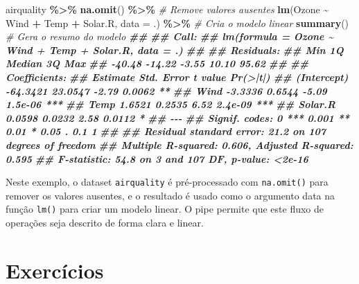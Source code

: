 \documentclass[
]{book}
\newenvironment{Shaded}{\begin{snugshade}}{\end{snugshade}}
\newcommand{\AttributeTok}[1]{\textcolor[rgb]{0.13,0.29,0.53}{#1}}
\newcommand{\CommentTok}[1]{\textcolor[rgb]{0.56,0.35,0.01}{\textit{#1}}}
\newcommand{\DocumentationTok}[1]{\textcolor[rgb]{0.56,0.35,0.01}{\textbf{\textit{#1}}}}
\newcommand{\FunctionTok}[1]{\textcolor[rgb]{0.13,0.29,0.53}{\textbf{#1}}}
\newcommand{\NormalTok}[1]{#1}
\newcommand{\SpecialCharTok}[1]{\textcolor[rgb]{0.81,0.36,0.00}{\textbf{#1}}}
\begin{document}
\begin{Shaded}
\begin{Highlighting}[]
\NormalTok{airquality }\SpecialCharTok{\%\textgreater{}\%}
  \FunctionTok{na.omit}\NormalTok{() }\SpecialCharTok{\%\textgreater{}\%} \CommentTok{\# Remove valores ausentes}
  \FunctionTok{lm}\NormalTok{(Ozone }\SpecialCharTok{\textasciitilde{}}\NormalTok{ Wind }\SpecialCharTok{+}\NormalTok{ Temp }\SpecialCharTok{+}\NormalTok{ Solar.R, }\AttributeTok{data =}\NormalTok{ .) }\SpecialCharTok{\%\textgreater{}\%} \CommentTok{\# Cria o modelo linear}
  \FunctionTok{summary}\NormalTok{() }\CommentTok{\# Gera o resumo do modelo}
\DocumentationTok{\#\# }
\DocumentationTok{\#\# Call:}
\DocumentationTok{\#\# lm(formula = Ozone \textasciitilde{} Wind + Temp + Solar.R, data = .)}
\DocumentationTok{\#\# }
\DocumentationTok{\#\# Residuals:}
\DocumentationTok{\#\#    Min     1Q Median     3Q    Max }
\DocumentationTok{\#\# {-}40.48 {-}14.22  {-}3.55  10.10  95.62 }
\DocumentationTok{\#\# }
\DocumentationTok{\#\# Coefficients:}
\DocumentationTok{\#\#             Estimate Std. Error t value Pr(\textgreater{}|t|)    }
\DocumentationTok{\#\# (Intercept) {-}64.3421    23.0547   {-}2.79   0.0062 ** }
\DocumentationTok{\#\# Wind         {-}3.3336     0.6544   {-}5.09  1.5e{-}06 ***}
\DocumentationTok{\#\# Temp          1.6521     0.2535    6.52  2.4e{-}09 ***}
\DocumentationTok{\#\# Solar.R       0.0598     0.0232    2.58   0.0112 *  }
\DocumentationTok{\#\# {-}{-}{-}}
\DocumentationTok{\#\# Signif. codes:  0 \textquotesingle{}***\textquotesingle{} 0.001 \textquotesingle{}**\textquotesingle{} 0.01 \textquotesingle{}*\textquotesingle{} 0.05 \textquotesingle{}.\textquotesingle{} 0.1 \textquotesingle{} \textquotesingle{} 1}
\DocumentationTok{\#\# }
\DocumentationTok{\#\# Residual standard error: 21.2 on 107 degrees of freedom}
\DocumentationTok{\#\# Multiple R{-}squared:  0.606,  Adjusted R{-}squared:  0.595 }
\DocumentationTok{\#\# F{-}statistic: 54.8 on 3 and 107 DF,  p{-}value: \textless{}2e{-}16}
\end{Highlighting}
\end{Shaded}

Neste exemplo, o dataset \texttt{airquality} é pré-processado com \texttt{na.omit()}
para remover os valores ausentes, e o resultado é usado como o argumento
data na função \texttt{lm()} para criar um modelo linear. O pipe permite que
este fluxo de operações seja descrito de forma clara e linear.

\section{Exercícios}\label{exercuxedcios-9}
\end{document}
